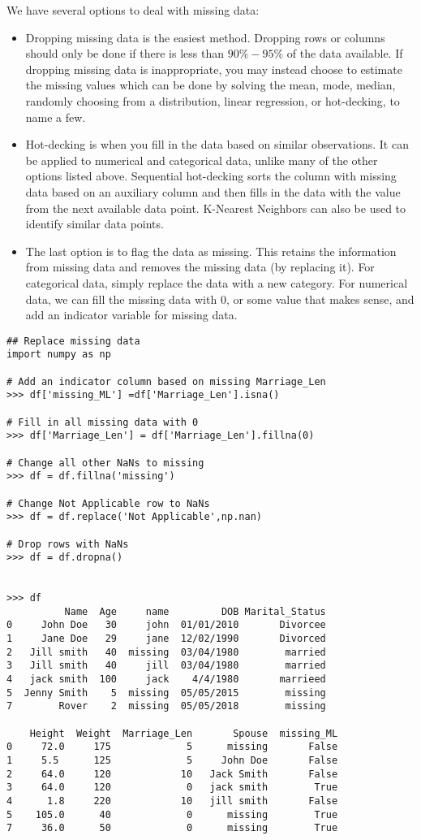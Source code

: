 \noindent We have several options to deal with missing data: 
\begin{itemize}
\item Dropping missing data is the easiest method.
Dropping rows or columns should only be done if there is less than $90\%-95\%$ of the data available.
If dropping missing data is inappropriate, you may instead choose to estimate the missing values which can be done by solving the mean, mode, median, randomly choosing from a distribution, linear regression, or hot-decking, to name a few.

\item Hot-decking is when you fill in the data based on similar observations.
It can be applied to numerical and categorical data, unlike many of the other options listed above.
Sequential hot-decking sorts the column with missing data based on an auxiliary column and then fills in the data with the value from the next available data point. K-Nearest Neighbors can also be used to identify similar data points.

\item The last option is to flag the data as missing. 
This retains the information from missing data and removes the missing data (by replacing it).
For categorical data, simply replace the data with a new category.
For numerical data, we can fill the missing data with $0$, or some value that makes sense, and add an indicator variable for missing data.
\end{itemize}

\begin{lstlisting}
## Replace missing data
import numpy as np

# Add an indicator column based on missing Marriage_Len
>>> df['missing_ML'] =df['Marriage_Len'].isna()

# Fill in all missing data with 0
>>> df['Marriage_Len'] = df['Marriage_Len'].fillna(0)

# Change all other NaNs to missing
>>> df = df.fillna('missing')

# Change Not Applicable row to NaNs
>>> df = df.replace('Not Applicable',np.nan)

# Drop rows with NaNs
>>> df = df.dropna()


>>> df
          Name  Age     name         DOB Marital_Status
0     John Doe   30     john  01/01/2010       Divorcee
1     Jane Doe   29     jane  12/02/1990       Divorced
2   Jill smith   40  missing  03/04/1980        married
3   Jill smith   40     jill  03/04/1980        married
4   jack smith  100     jack    4/4/1980       marrieed
5  Jenny Smith    5  missing  05/05/2015        missing
7        Rover    2  missing  05/05/2018        missing

    Height  Weight  Marriage_Len       Spouse  missing_ML
0     72.0     175             5      missing       False
1     5.5      125             5     John Doe       False
2     64.0     120            10   Jack Smith       False
3     64.0     120             0   jack smith        True
4      1.8     220            10   jill smith       False
5    105.0      40             0      missing        True
7     36.0      50             0      missing        True
\end{lstlisting}

